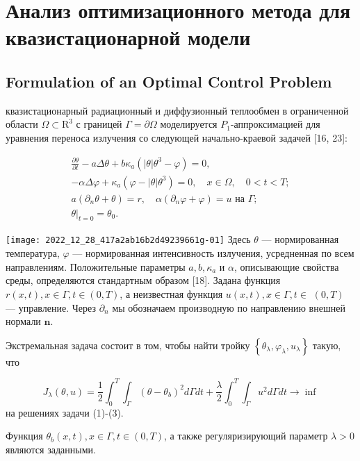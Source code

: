 \section{Анализ оптимизационного метода для квазистационарной модели}\label{sec:ch2/sec3}

\subsection{Formulation of an Optimal Control Problem}\label{subsec:ch2/sec3/subsec1}
квазистационарный радиационный и диффузионный теплообмен в ограниченной области
$\Omega \subset \mathrm{R}^{3}$ с границей $\Gamma=\partial \Omega$ моделируется
$P_{1}$-аппроксимацией для уравнения переноса излучения со следующей начально-краевой задачей [16, 23]:

\[
\begin{gathered}
\frac{\partial \theta}{\partial t}-a \Delta \theta+b
\kappa_{a}\left(|\theta| \theta^{3}-\varphi\right)=0, \\
-\alpha \Delta \varphi+\kappa_{a}\left(\varphi-|\theta| \theta^{3}\right)=0,
\quad x \in \Omega, \quad 0<t<T; \\
a\left(\partial_{n} \theta+\theta\right)=r,
\quad \alpha\left(\partial_{n} \varphi+\varphi\right)=u \text { на } \Gamma; \\
\left.\theta\right|_{t=0}=\theta_{0}.
\end{gathered}
\]

\texttt{[image: 2022\_12\_28\_417a2ab16b2d49239661g-01]}
Здесь $\theta$ — нормированная температура, $\varphi$ — нормированная интенсивность излучения,
усредненная по всем направлениям.
Положительные параметры $a, b, \kappa_{a}$ и $\alpha$, описывающие свойства среды,
определяются стандартным образом [18].
Задана функция $r(x, t), x \in \Gamma, t \in(0, T)$,
а неизвестная функция $u(x, t), x \in \Gamma, t \in$ $(0, T)$ — управление.
Через $\partial_{n}$ мы обозначаем производную по направлению внешней нормали $\mathbf{n}$.


Экстремальная задача состоит в том, чтобы найти тройку
$\left\{\theta_{\lambda}, \varphi_{\lambda}, u_{\lambda}\right\}$ такую, что

\[
J_{\lambda}(\theta, u)=\frac{1}{2} \int_{0}^{T}
\int_{\Gamma}\left(\theta-\theta_{b}\right)^{2} d \Gamma d t+\frac{\lambda}{2}
\int_{0}^{T} \int_{\Gamma} u^{2} d \Gamma d t \rightarrow \inf
\]
на решениях задачи (1)-(3).

Функция $\theta_{b}(x, t), x \in \Gamma, t \in(0, T)$,
а также регуляризирующий параметр $\lambda>0$ являются заданными.

